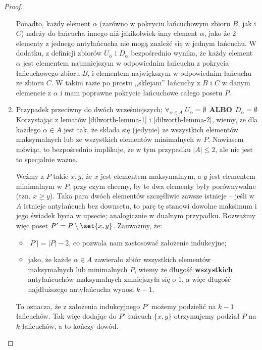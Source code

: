 \begin{proof}
\begin{enumerate}
            Ponadto, każdy element \(\alpha\) (zarówno w pokryciu łańcuchowym zbioru \(B\), jak i \(C\)) należy do łańcucha innego niż jakikolwiek inny element \(\alpha\), jako że 2 elementy z jednego antyłańcucha nie mogą znaleźć się w jednym łańcuchu. W dodatku, z definicji zbiorów \(U_{\alpha}\) i \(D_{\alpha}\) bezpośrednio wynika, że każdy element \(\alpha\) jest elementem najmniejszym w odpowiednim łańcuchu z pokrycia łańcuchowego zbioru \(B\), i elementem największym w odpowiednim łańcuchu ze zbioru \(C\). W takim razie po prostu ,,sklejam'' łańcuchy z \(B\) i \(C\) w danym elemencie z \(\alpha\) i mam poprawne pokrycie łańcuchowe całego posetu \(P\).
            
            \item Przypadek przeciwny do dwóch wcześniejszych; \(\forall_{\alpha \in A } \; U_{\alpha} = \emptyset \hspace{5pt} \mathbf{ALBO} \hspace{5pt} D_{\alpha} = \emptyset\) \\

            Korzystając z lematów \ref{dilworth-lemma-1} i \ref{dilworth-lemma-2}, wiemy, że dla każdego \(\alpha \in A\) jest tak, że składa się (jedynie) ze wszystkich elementów maksymalnych lub ze wszystkich elementów minimalnych w \(P\). Nawiasem mówiąc, to bezpośrednio implikuje, że w tym przypadku \( |A| \leq 2 \), ale nie jest to specjalnie ważne. 
            
            Weźmy z \(P\) takie \(x, y\), że \(x\) jest elementem maksymalnym, a \(y\) jest elementem minimalnym w \(P\), przy czym chcemy, by te dwa elementy były porównywalne (tzn. \( x \geq y\)). Taka para dwóch elementów szczęśliwie zawsze istnieje -- jeśli w \(A\) istnieje antyłańcuch bez downsetu, to parę tę stanowi dowolne maksimum i jego świadek bycia w upsecie; analogicznie w dualnym przypadku.  Rozważmy więc poset \(P' = P \setminus \set{x,y} \). Zauważmy, że:
            \begin{itemize}
                \item \( |P'| = |P| - 2\), co pozwala nam zastosować założenie indukcyjne;
                \item jako, że każde \( \alpha \in A\) zawierało zbiór wszystkich elementów maksymalnych lub minimalnych \(P\), wiemy że długość \textbf{wszystkich} antyłańcuchów maksymalnych zmniejszyła się o 1, a więc długość najdłuższego antyłańcucha wynosi \(k-1\).
            \end{itemize}
            To oznacza, że z założenia indukcyjnego \( P' \) możemy podzielić na \(k-1\) łańcuchów. Tak więc dodając do \(P'\) łańcuch \( \{x, y\} \) otrzymujemy podział \(P\) na \(k\) łańcuchów, a to kończy dowód.
            
    \end{enumerate}
        
     \end{proof}